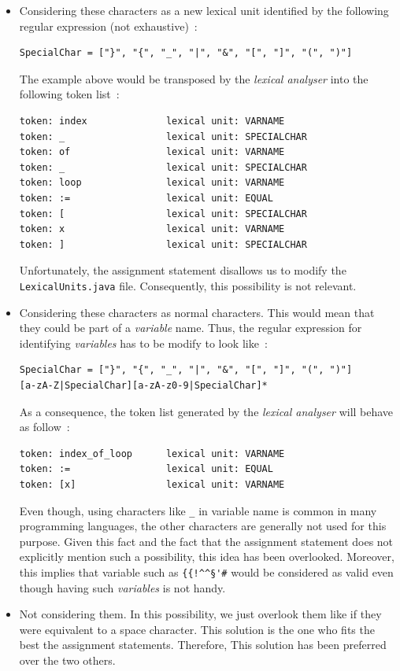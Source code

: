 \documentclass[a4paper,11pt]{article}
\begin{document}
    \begin{itemize}
      \item Considering these characters as a new lexical unit identified by the following regular expression (not exhaustive)~:
        \begin{verbatim}
SpecialChar = ["}", "{", "_", "|", "&", "[", "]", "(", ")"]
        \end{verbatim}
        The example above would be transposed by the \textit{lexical analyser} into the following token list~:
        \begin{verbatim}
token: index              lexical unit: VARNAME
token: _                  lexical unit: SPECIALCHAR
token: of                 lexical unit: VARNAME
token: _                  lexical unit: SPECIALCHAR
token: loop               lexical unit: VARNAME
token: :=                 lexical unit: EQUAL
token: [                  lexical unit: SPECIALCHAR
token: x                  lexical unit: VARNAME
token: ]                  lexical unit: SPECIALCHAR
        \end{verbatim}
        Unfortunately, the assignment statement disallows us to modify the \verb|LexicalUnits.java| file. Consequently, this possibility is not relevant.
      \item Considering these characters as normal characters. This would mean that they could be part of a \textit{variable} name. Thus, the regular expression for identifying \textit{variables} has to be modify to look like~:
        \begin{verbatim}
SpecialChar = ["}", "{", "_", "|", "&", "[", "]", "(", ")"]
[a-zA-Z|SpecialChar][a-zA-z0-9|SpecialChar]*
        \end{verbatim}
        As a consequence, the token list generated by the \textit{lexical analyser} will behave as follow~:
        \begin{verbatim}
token: index_of_loop      lexical unit: VARNAME
token: :=                 lexical unit: EQUAL
token: [x]                lexical unit: VARNAME
        \end{verbatim}
        Even though, using characters like \verb|_| in variable name is common in many programming languages, the other characters are generally not used for this purpose. Given this fact and the fact that the assignment statement does not explicitly mention such a possibility, this idea has been overlooked. Moreover, this implies that variable such as \verb|{{!^^§'#| would be considered as valid even though having such \textit{variables} is not handy.
      \item Not considering them. In this possibility, we just overlook them like if they were equivalent to a space character. This solution is the one who fits the best the assignment statements. Therefore, This solution has been preferred over the two others.
    \end{itemize}
\end{document}
